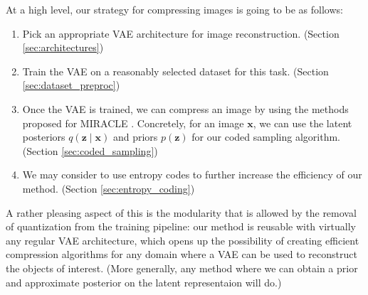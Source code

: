\documentclass{article}
\renewcommand{\vec}[1]{\mathbf{#1}}
\begin{document}
At a high level, our strategy for compressing images is going to be as follows:

\begin{enumerate}
\item Pick an appropriate VAE architecture for image reconstruction. (Section
  \ref{sec:architectures})
\item Train the VAE on a reasonably selected dataset for this task. (Section
  \ref{sec:dataset_preproc})
\item Once the VAE is trained, we can compress an image by using the methods
  proposed for MIRACLE \cite{havasi2018minimal}. Concretely, for an image
  $\vec{x}$, we can use the latent posteriors $q(\vec{z} \mid \vec{x})$ and
  priors $p(\vec{z})$ for our coded sampling algorithm. (Section
  \ref{sec:coded_sampling})
\item We may consider to use entropy codes to further increase the efficiency of
  our method. (Section \ref{sec:entropy_coding})
\end{enumerate}

\par
A rather pleasing aspect of this is the modularity that is allowed by the
removal of quantization from the training pipeline: our method is reusable with
virtually any regular VAE architecture, which opens up the possibility of
creating efficient compression algorithms for any domain where a VAE can be used
to reconstruct the objects of interest. (More generally, any method where we
can obtain a prior and approximate posterior on the latent representaion will do.)
\end{document}
